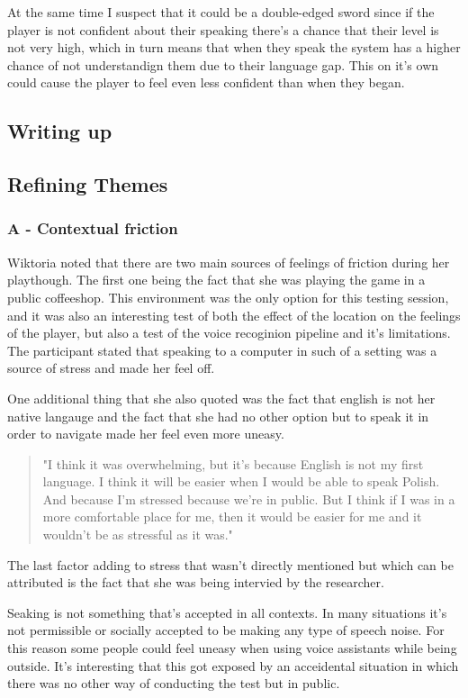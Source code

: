 At the same time I suspect that it could be a double-edged sword since if the player is not confident about their speaking there's a chance that their level is not very high, which in turn means that when they speak the system has a higher chance of not understandign them due to their language gap. This on it's own could cause the player to feel even less confident than when they began.


\subsection{Writing up}

\subsection{Refining Themes}

\subsubsection{A - Contextual friction}
Wiktoria noted that there are two main sources of feelings of friction during her playthough.
The first one being the fact that she was playing the game in a public coffeeshop. This environment was the only option for this testing session, and it was also an interesting test of both the effect of the location on the feelings of the player, but also a test of the voice recoginion pipeline and it's limitations. 
The participant stated that speaking to a computer in such of a setting was a source of stress and made her feel off. 

One additional thing that she also quoted was the fact that english is not her native langauge and the fact that she had no other option but to speak it in order to navigate made her feel even more uneasy.

\begin{quote}
    "I think it was overwhelming, but it's because English is not my first language. I think it will be easier when I would be able to speak Polish. And because I'm stressed because we're in public. But I think if I was in a more comfortable place for me, then it would be easier for me and it wouldn't be as stressful as it was."
\end{quote}

The last factor adding to stress that wasn't directly mentioned but which can be attributed is the fact that she was being intervied by the researcher. 

Seaking is not something that's accepted in all contexts. In many situations it's not permissible or socially accepted to be making any type of speech noise. For this reason some people could feel uneasy when using voice assistants while being outside. It's interesting that this got exposed by an acceidental situation in which there was no other way of conducting the test but in public.


